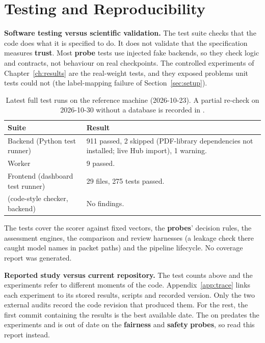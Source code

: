 \chapter{Testing and Reproducibility}\label{ch:testing}

\textbf{Software testing versus scientific validation.} The test suite checks that the code does what it is specified to do. It does not validate that the specification measures \textbf{trust}. Most \textbf{probe} tests use injected fake backends, so they check logic and contracts, not behaviour on real checkpoints. The controlled experiments of Chapter~\ref{ch:results} are the real-weight tests, and they exposed problems unit tests could not (the label-mapping failure of Section~\ref{sec:setup}).

\begin{table}[!htbp]
\centering\small
\caption{Latest full test runs on the reference machine (2026-10-23). A partial re-check on 2026-10-30 without a database is recorded in .}\label{tab:tests}
\begin{tabularx}{\textwidth}{|>{\raggedright\arraybackslash}p{3.2cm}|L|}
\hline
\textbf{Suite} & \textbf{Result}\\
\hline
Backend  (Python test runner) & 911 passed, 2 skipped (PDF-library dependencies not installed; live Hub import), 1 warning.\\ \hline
Worker  & 9 passed.\\ \hline
Frontend  (dashboard test runner) & 29 files, 275 tests passed.\\ \hline
{} (code-style checker, backend) & No findings.\\
\hline
\end{tabularx}
\end{table}

The tests cover the scorer against fixed vectors, the \textbf{probes}' decision rules, the assessment engines, the comparison and review harnesses (a leakage check there caught model names in packet paths) and the pipeline lifecycle. No coverage report was generated.

\textbf{Reported study versus current repository.} The test counts above and the experiments refer to different moments of the code. Appendix~\ref{app:trace} links each experiment to its stored results, scripts and recorded version. Only the two external audits record the code revision that produced them. For the rest, the first commit containing the results is the best available date. The  on  predates the experiments and is out of date on the \textbf{fairness} and \textbf{safety} \textbf{probes}, so read this report instead.


